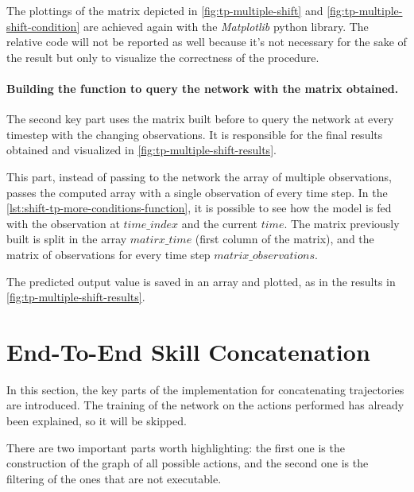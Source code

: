 The plottings of the matrix depicted in \cref{fig:tp-multiple-shift} and \cref{fig:tp-multiple-shift-condition} are achieved again with the \emph{Matplotlib} python library. The relative code will not be reported as well because it's not necessary for the sake of the result but only to visualize the correctness of the procedure.


\paragraph{Building the function to query the network with the matrix obtained. }
The second key part uses the matrix built before to query the network at every timestep with the changing observations. It is responsible for the final results obtained and visualized in \cref{fig:tp-multiple-shift-results}.

This part, instead of passing to the network the array of multiple observations, passes the computed array with a single observation of every time step. In the \cref{lst:shift-tp-more-conditions-function}, it is possible to see how the model is fed with the observation at $time\_index$ and the current $time$. The matrix previously built is split in the array $matirx\_time$  (first column of the matrix), and the matrix of observations for every time step $matrix\_observations$.



The predicted output value is saved in an array and plotted, as in the results in \cref{fig:tp-multiple-shift-results}.

\newpage
\section{End-To-End Skill Concatenation}

In this section, the key parts of the implementation for concatenating trajectories are introduced. The training of the network on the actions performed has already been explained, so it will be skipped. 

There are two important parts worth highlighting: the first one is the construction of the graph of all possible actions, and the second one is the filtering of the ones that are not executable. 

